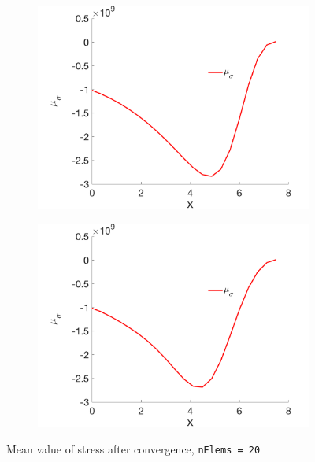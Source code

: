 \documentclass[a4paper]{article}
\begin{document}
\begin{figure} [H]
\begin{subfigure}{0.45\textwidth}
    \includegraphics[width=1.0\linewidth]{p3n20_mean.png}
    \label{fig:mean_p3}
  \end{subfigure}
  \begin{subfigure}{0.45\textwidth}
    \centering
    \includegraphics[width=1.0\linewidth]{p4n20_mean.png}
    \label{fig:mean_p4}
  \end{subfigure}  
  \caption{Mean value of stress after convergence, \texttt{nElems = 20} \label{fig:mean}}
\end{figure}
\end{document}
